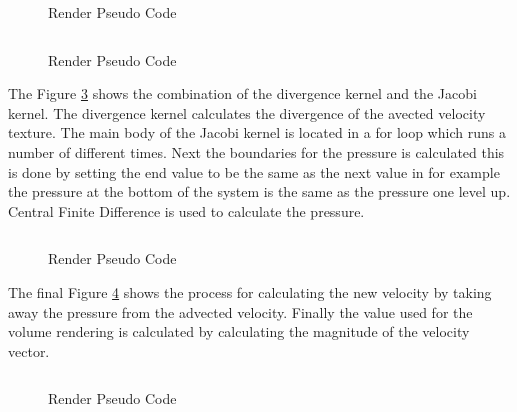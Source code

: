 \begin{figure}[h]
\centering
\begin{lstlisting}

\end{lstlisting}
\caption{Render Pseudo Code}
\label{sc:water}
\end{figure}

\begin{figure}[h]
\centering
\begin{lstlisting}

\end{lstlisting}
\caption{Render Pseudo Code}
\label{sc:thermo}
\end{figure}

The Figure \ref{sc:div_jacobi} shows the combination of the divergence kernel and the Jacobi kernel.
The divergence kernel calculates the divergence of the avected velocity texture.
The main body of the Jacobi kernel is located in a for loop which runs a number of different times.
Next the boundaries for the pressure is calculated this is done by setting the end value to be the same as the next value in for example the pressure at the bottom of the system is the same as the pressure one level up.
Central Finite Difference is used to calculate the pressure.

\begin{figure}[h]
\centering
\begin{lstlisting}

\end{lstlisting}
\caption{Render Pseudo Code}
\label{sc:div_jacobi}
\end{figure}

The final Figure \ref{sc:cloud_pseudo} shows the process for calculating the new velocity by taking away the pressure from the advected velocity.
Finally the value used for the volume rendering is calculated by calculating the magnitude of the velocity vector.

\begin{figure}[h]
\centering
\begin{lstlisting}

\end{lstlisting}
\caption{Render Pseudo Code}
\label{sc:cloud_pseudo}
\end{figure}
